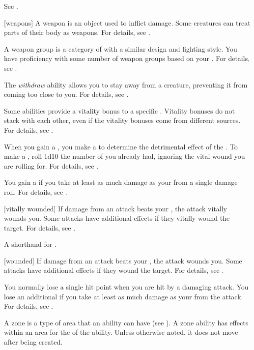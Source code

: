  See .

[weapons] A weapon is an object used to inflict damage.
Some creatures can treat parts of their body as weapons.
For details, see .

 A weapon group is a category of  with a similar design and fighting style.
You have proficiency with some number of weapon groups based on your .
For details, see .

 The \textit{withdraw} ability allows you to stay away from a creature, preventing it from coming too close to you.
For details, see .

 Some abilities provide a vitality bonus to a specific .
Vitality bonuses do not stack with each other, even if the vitality bonuses come from different sources.
For details, see .

 When you gain a , you make a  to determine the detrimental effect of the .
To make a , roll 1d10 \sub the number of  you already had, ignoring the vital wound you are rolling for.
For details, see .

 You gain a  if you take at least as much damage as your  from a single damage roll.
For details, see .

[vitally wounded] If damage from an attack beats your , the attack vitally wounds you.
Some attacks have additional effects if they vitally wound the target.
For details, see .

 A shorthand for .

[wounded] If damage from an attack beats your , the attack wounds you.
Some attacks have additional effects if they wound the target.
For details, see .

 You normally lose a single hit point when you are hit by a damaging attack.
You lose an additional  if you take at least as much damage as your  from the attack.
For details, see .

 A zone is a type of area that an ability can have (see ).
A zone ability has effects within an area for the  of the ability.
Unless otherwise noted, it does not move after being created.
